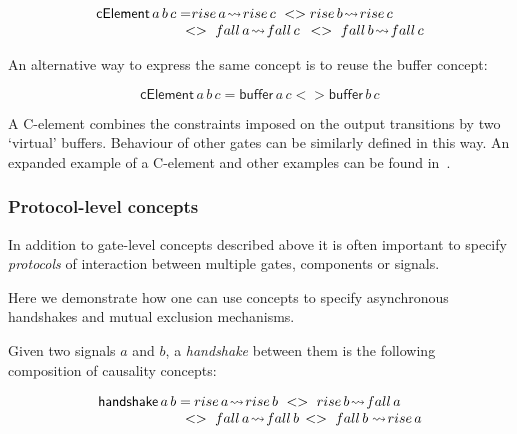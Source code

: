 \documentclass[british,conference,compsoc]{IEEEtran}
\begin{document}
\[
\begin{array}{lcl}
\mathsf{cElement}\,a\, b\, c=&\hspace{-10mm}rise\,a\!\rightsquigarrow\! 
	rise\,c\ <> rise\,b\!\rightsquigarrow\! rise\,c\ \\
&\hspace{-5mm}<>\ fall\,a\!\rightsquigarrow\! fall\,c\ \,
	<>\ fall\,b\!\rightsquigarrow\! fall\,c
\end{array}
\]

\vspace{-1mm}

An alternative way to express the same concept is to reuse the buffer concept:

\vspace{-3mm}

\[
\mathsf{cElement}\,a\, b\, c=\mathsf{buffer}\,a\, c <> \mathsf{buffer}\,b\, c
\]

\vspace{-1mm}

A C-element combines the constraints imposed on the output
transitions by two `virtual' buffers. Behaviour of other gates can be similarly
defined in this way. An expanded example of a C-element and other examples can 
be found in~\cite{2015_Beaumont_MEMOCODE}.

\vspace{-2mm}

\subsubsection{Protocol-level concepts} In addition to gate-level concepts
described above it is often important to specify \emph{protocols}
of interaction between multiple gates, components or signals. 

Here we demonstrate how one can use concepts to specify asynchronous handshakes
and mutual exclusion mechanisms.

Given two signals $a$ and $b$, a \emph{handshake} between them is
the following composition of causality concepts:

\[
\begin{array}{lcl}
\mathsf{handshake}\,a\, b=&\hspace{-8mm}rise\,a\!\rightsquigarrow\! rise\,b\ 
	<>\ rise\,b\!\rightsquigarrow\! fall\,a \\
&\hspace{-5mm}<>\ fall\,a\!\rightsquigarrow\! fall\,b \, 
	<>\ fall\,b \rightsquigarrow\! rise\,a
\end{array}
\]
\end{document}
